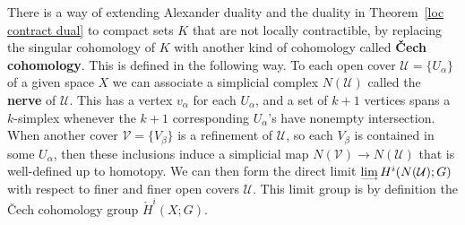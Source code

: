 There is a way of extending Alexander duality and the duality in Theorem~\ref{loc contract dual} to compact sets $K$ that are not locally contractible, by replacing the singular cohomology of $K$ with another kind of cohomology called \textbf{\v{C}ech cohomology}. This is defined in
the following way. To each open cover $\mathcal{U}=\{U_\alpha\}$ of a given space $X$ we can associate a simplicial complex $N(\mathcal{U})$ called the \textbf{nerve} of $\mathcal{U}$. This has a vertex $v_\alpha$ for each $U_\alpha$, and a set of $k+1$ vertices spans a $k$-simplex whenever the $k+1$ corresponding $U_\alpha$'s have nonempty intersection. When another cover $\mathcal{V}=\{V_\beta\}$ is a refinement of $\mathcal{U}$, so each $V_\beta$ is contained in some $U_\alpha$, then these inclusions induce a simplicial map $N(\mathcal{V})\to N(\mathcal{U})$ that is well-defined up to homotopy. We can then form the direct limit $\rlim H^i(N(\mathcal{U});G)$ with respect to finer and finer open covers $\mathcal{U}$. This limit group is by definition the \v{C}ech cohomology group $\check{H}^i(X;G)$.
